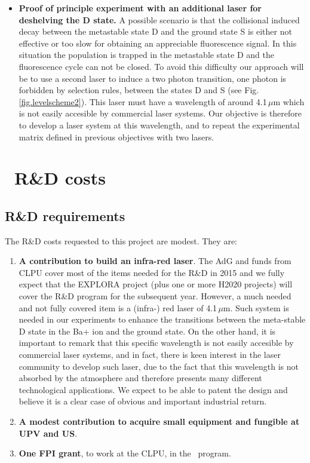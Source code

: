 \documentclass[a4paper,11pt,oneside]{article}
\begin{document}
\begin{itemize}
	\item \textbf{Proof of principle experiment with an additional laser for deshelving the D state.}
A possible scenario is that the collisional induced decay between the metastable state D and the ground state S is either not effective or too slow for obtaining an appreciable fluorescence signal. In this situation the population is trapped in the metastable state D  and the fluorescence cycle can not be closed. To avoid this difficulty our approach will be to use a second laser to induce a two photon transition, one photon is forbidden by selection rules, between the states D and S (see Fig.\,\ref{fig.levelscheme2}). This laser must have a wavelength of around 4.1\,$\mu$m which is not easily accesible by commercial laser systems. Our objective is therefore to develop a laser system at this wavelength, and to repeat the experimental matrix defined in previous objectives with two lasers.
	
\end{itemize}

\section{\BATA\ R\&D costs}
\label{bata.costs}

\subsection{R\&D requirements}
The R\&D costs requested to this project are modest. They are:
\begin{enumerate}
\item {\bf A contribution to build an infra-red laser}. The AdG and funds from CLPU cover most of the items needed for the R\&D in 2015 and we fully expect that the EXPLORA project (plus one or more H2020 projects) will cover the R\&D program for the subsequent year. However, a much needed and not fully covered item is a (infra-) red laser of 4.1\,$\mu$m. Such system is needed in our experiments to enhance the transitions between the meta-stable D state in the Ba+ ion and the ground state. On the other hand, it is important to remark that this specific wavelength is not easily accesible by  commercial laser systems, and in fact, there is keen interest in the laser community to develop such laser, due to the fact that this wavelength is not absorbed by the atmosphere and therefore presents many different technological applications. We expect to be able to patent the design and believe it is a clear case of obvious and important industrial return. 
\item {\bf A modest contribution to acquire small equipment and fungible at UPV and US}.
\item {\bf One FPI grant}, to work at the CLPU, in the \BATA\ program. 
\end{enumerate}
\end{document}
